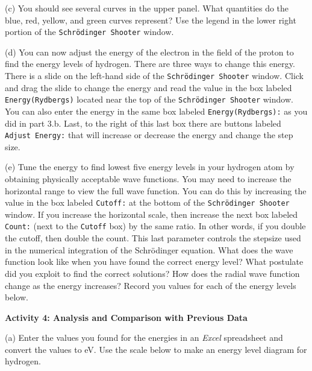 (c) You should see several curves in the upper panel.
What quantities do the blue, red, yellow, and green curves represent?
Use the legend in the lower right portion of the {\tt Schr\"odinger Shooter}
window.
\vspace{3.0cm}

(d) You can now adjust the energy of the electron in the field of the proton to find 
the energy levels of hydrogen.
There are three ways to change this energy.
There is a slide on the left-hand side of the {\tt Schr\"odinger Shooter} window.
Click and drag the slide to change the energy and read the value
in the box labeled {\tt Energy(Rydbergs)} located near the top of the 
{\tt Schr\"odinger Shooter} window.
You can also enter the energy in the same box
labeled {\tt Energy(Rydbergs):} as you did in part 3.b.
Last, to the right of this last box there are buttons labeled
{\tt Adjust Energy:} that will increase or decrease the energy and change the step size.

(e) Tune the energy to find lowest five energy levels in your hydrogen atom by obtaining
physically acceptable wave functions.
You may need to increase the horizontal range to view the full wave function.
You can do this by increasing the value in the box labeled {\tt Cutoff:} at the
bottom of the {\tt Schr\"odinger Shooter} window.
If you increase the horizontal scale, then increase the next box labeled
{\tt Count:} (next to the {\tt Cutoff} box) by the same ratio.
In other words, if you double the cutoff, then double the count.
This last parameter controls the stepsize used in the numerical integration of
the Schr\"odinger equation.
What does the wave function look like when you have found the correct energy level?
What postulate did you exploit to find the correct solutions?
How does the radial wave function change as the energy increases?
Record you values for each of the energy levels below.
\vspace{5.0cm}

\textbf{Activity 4: Analysis and Comparison with Previous Data}

(a) Enter the values you found for the energies in an {\it Excel} spreadsheet
and convert the values to eV.
Use the scale below to make an energy level diagram for hydrogen.

\vspace{0.25in}

